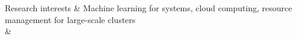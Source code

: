\nohyphens{ Research interests}
& Machine learning for systems, cloud computing, resource management for large-scale clusters \\
& \\

